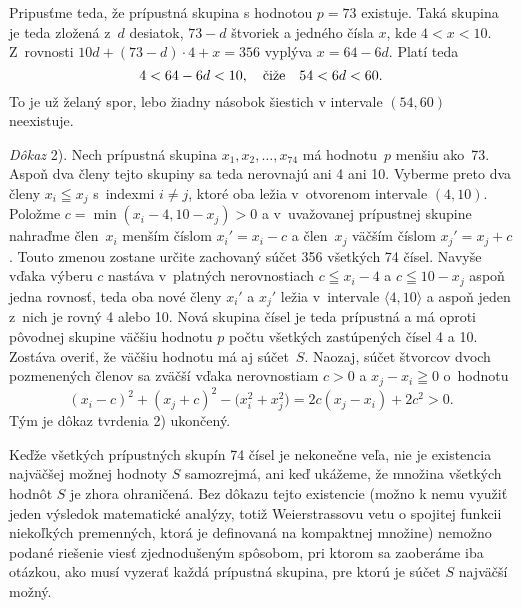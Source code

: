 {Pripusťme teda, že prípustná skupina s hodnotou $p=73$ existuje.
Taká skupina je teda zložená z~$d$ desiatok, $73-d$ štvoriek
a jedného čísla $x$, kde $4<x<10$. Z~rovnosti $10d+(73-d)\cdot4+x=356$
vyplýva $x=64-6d$. Platí teda
$$
4<64-6d<10,\quad\hbox{čiže}\quad 54<6d<60.
$$
To je už želaný spor, lebo žiadny násobok šiestich v intervale
$(54,60)$ neexistuje.

\smallskip
\emph{Dôkaz} 2). Nech prípustná skupina $x_1,x_2,\dots,x_{74}$ má
hodnotu~$p$ menšiu ako~73. Aspoň dva členy tejto skupiny sa teda
nerovnajú ani 4 ani 10. Vyberme preto dva členy
$x_i\leqq x_j$ s~indexmi $i\ne j$, ktoré oba ležia
v~otvorenom intervale $(4,10)$. Položme $c=\min(x_i-4,10-x_j)>0$
a v~uvažovanej prípustnej skupine nahraďme člen~$x_i$ menším
číslom $x_i'=x_i-c$ a člen~$x_j$ väčším číslom $x_j'=x_j+c$.
Touto zmenou zostane určite zachovaný súčet 356 všetkých 74 čísel.
Navyše vďaka výberu $c$ nastáva v~platných nerovnostiach $c\leqq x_i-4$
a $c\leqq 10-x_j$ aspoň jedna rovnosť, teda oba
nové členy $x_i'$ a $x_j'$ ležia v~intervale $\langle4,10\rangle$ a
aspoň jeden z~nich je rovný 4 alebo 10.
Nová skupina čísel je teda prípustná a má oproti pôvodnej skupine
väčšiu hodnotu $p$ počtu všetkých zastúpených čísel 4 a 10.
Zostáva overiť, že väčšiu hodnotu má aj súčet~$S$.
Naozaj, súčet štvorcov dvoch pozmenených členov
sa zväčší vďaka nerovnostiam $c>0$ a $x_j-x_i\geqq0$ o~hodnotu
$$
(x_i-c)^2+(x_j+c)^2-\bigl(x_i^2 + x_j^2\bigr)=
2c(x_j - x_i)+2c^2>0.
$$
Tým je dôkaz tvrdenia 2) ukončený.

\poznamka
Keďže všetkých prípustných skupín 74 čísel je nekonečne
veľa, nie je existencia najväčšej možnej hodnoty $S$ samozrejmá, ani
keď ukážeme, že množina všetkých hodnôt $S$ je zhora ohraničená.
Bez dôkazu tejto existencie (možno k nemu využiť jeden výsledok
matematické analýzy, totiž Weierstrassovu vetu o spojitej funkcii
niekoľkých premenných, ktorá je definovaná na kompaktnej
množine) nemožno podané riešenie viesť zjednodušeným spôsobom,
pri ktorom sa zaoberáme iba otázkou, ako musí vyzerať každá
prípustná skupina, pre ktorú je súčet $S$ najväčší možný.

}
